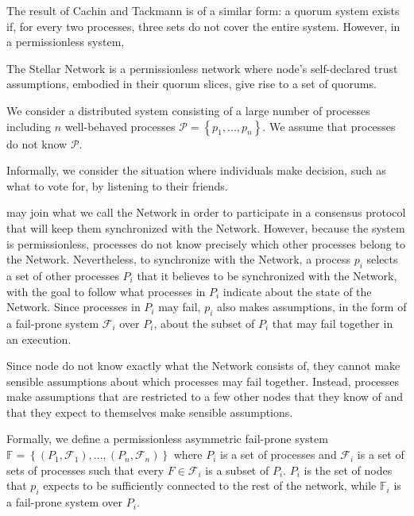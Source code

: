 \documentclass[11pt]{article}
\begin{document}
The result of Cachin and Tackmann is of a similar form: a quorum system exists if, for every two processes, three sets do not cover the entire system. However, in a permissionless system,


The Stellar Network is a permissionless network where node's self-declared trust assumptions, embodied in their quorum slices, give rise to a set of quorums.

We consider a distributed system consisting of a large number of processes including $n$ well-behaved processes $\mathcal{P}=\left\{p_1,...,p_n\right\}$. We assume that processes do not know $\mathcal{P}$.

Informally, we consider the situation where individuals make decision, such as what to vote for, by listening to their friends.

may join what we call the Network in order to participate in a consensus protocol that will keep them synchronized with the Network. However, because the system is permissionless, processes do not know precisely which other processes belong to the Network. Nevertheless, to synchronize with the Network, a process $p_i$ selects a set of other processes $P_i$ that it believes to be synchronized with the Network, with the goal to follow what processes in $P_i$ indicate about the state of the Network. Since processes in $P_i$ may fail, $p_i$ also makes assumptions, in the form of a fail-prone system $\mathcal{F}_i$ over $P_i$, about the subset of $P_i$ that may fail together in an execution.


Since node do not know exactly what the Network consists of, they cannot make sensible assumptions about which processes may fail together. Instead, processes make assumptions that are restricted to a few other nodes that they know of and that they expect to themselves make sensible assumptions.

Formally, we define a permissionless asymmetric fail-prone system $\mathbb{F}=\left\{\left(P_1,\mathcal{F}_1\right),...,\left(P_n,\mathcal{F}_n\right)\right\}$ where $P_i$ is a set of processes and $\mathcal{F}_i$ is a set of sets of processes such that every $F\in\mathcal{F}_i$ is a subset of $P_i$. $P_i$ is the set of nodes that $p_i$ expects to be sufficiently connected to the rest of the network, while $\mathbb{F}_i$ is a fail-prone system over $P_i$.
\end{document}
